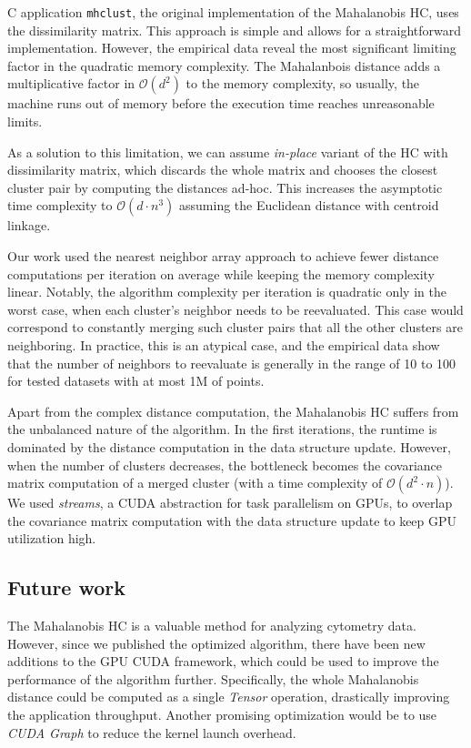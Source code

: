 C application \texttt{mhclust}, the original implementation of the Mahalanobis HC, uses the dissimilarity matrix. This approach is simple and allows for a straightforward implementation. However, the empirical data reveal the most significant limiting factor in the quadratic memory complexity. The Mahalanbois distance adds a multiplicative factor in $\mathcal{O}(d^2)$ to the memory complexity, so usually, the machine runs out of memory before the execution time reaches unreasonable limits.

As a solution to this limitation, we can assume \emph{in-place} variant of the HC with dissimilarity matrix, which discards the whole matrix and chooses the closest cluster pair by computing the distances ad-hoc. This increases the asymptotic time complexity to $\mathcal{O}(d \cdot n^3)$ assuming the Euclidean distance with centroid linkage.

Our work used the nearest neighbor array approach to achieve fewer distance computations per iteration on average while keeping the memory complexity linear. Notably, the algorithm complexity per iteration is quadratic only in the worst case, when each cluster's neighbor needs to be reevaluated. This case would correspond to constantly merging such cluster pairs that all the other clusters are neighboring. In practice, this is an atypical case, and the empirical data show that the number of neighbors to reevaluate is generally in the range of 10 to 100 for tested datasets with at most 1M of points.

Apart from the complex distance computation, the Mahalanobis HC suffers from the unbalanced nature of the algorithm. In the first iterations, the runtime is dominated by the distance computation in the data structure update. However, when the number of clusters decreases, the bottleneck becomes the covariance matrix computation of a merged cluster (with a time complexity of $\mathcal{O}(d^2 \cdot n)$). We used \emph{streams}, a CUDA abstraction for task parallelism on GPUs, to overlap the covariance matrix computation with the data structure update to keep GPU utilization high.

\subsection{Future work}

The Mahalanobis HC is a valuable method for analyzing cytometry data. However, since we published the optimized algorithm, there have been new additions to the GPU CUDA framework, which could be used to improve the performance of the algorithm further. Specifically, the whole Mahalanobis distance could be computed as a single \emph{Tensor} operation, drastically improving the application throughput. Another promising optimization would be to use \emph{CUDA Graph} to reduce the kernel launch overhead.


